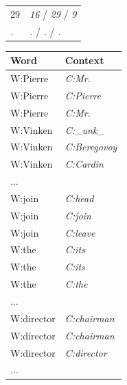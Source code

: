 \begin{table}[ht]
\begin{tabular}{|ll|}
29 & \textit{16} /  \textit{29} / \textit{9}\\
. & \textit{.}  / \textit{.} / \textit{.}\\
\hline
\end{tabular}
\quad
\begin{tabular}{|ll|}
\hline
\textbf{Word} & \textbf{Context}\\
\hline
W:Pierre & \textit{C:Mr.}\\
W:Pierre & \textit{C:Pierre}\\
W:Pierre & \textit{C:Mr.}\\
W:Vinken & \textit{C:\_unk\_}\\
W:Vinken & \textit{C:Beregovoy}\\
W:Vinken & \textit{C:Cardin}\\
$\hdots$&\\
W:join & \textit{C:head}\\
W:join & \textit{C:join}\\
W:join & \textit{C:leave}\\
W:the & \textit{C:its}\\
W:the & \textit{C:its}\\
W:the & \textit{C:the}\\
$\hdots$&\\
W:director & \textit{C:chairman}\\
W:director & \textit{C:chairman}\\
W:director & \textit{C:director}\\
$\hdots$&\\
\hline
\end{tabular}
\label{tab:samples}
\end{table}

